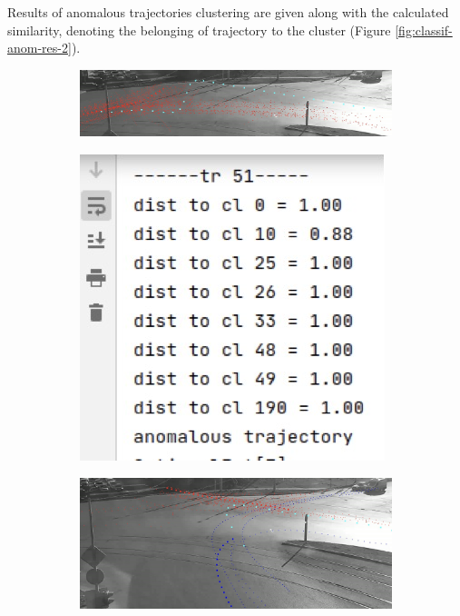 Results of anomalous trajectories clustering are given along with the calculated 
similarity, denoting the belonging of trajectory to the cluster (Figure \ref{fig:classif-anom-res-2}).

\begin{figure}[!htb]
	\centering
	\begin{subfigure}[!htb]{0.70\textwidth}
		\centering{}
		\includegraphics[width=\textwidth]{images/classif-res/classif-anom-res-2-1.jpeg}
		\caption{}
	\end{subfigure}
	\hfill
	\begin{subfigure}[!htb]{0.28\textwidth}
		\centering{}
		\includegraphics[width=\textwidth]{images/classif-res/classif-anom-res-2-1-stat.jpeg}
		\caption{}
	\end{subfigure}
	\hfill
	\begin{subfigure}[!htb]{0.70\textwidth}
		\centering{}
		\includegraphics[width=\textwidth]{images/classif-res/classif-anom-res-2-2.jpeg}

\end{subfigure}
\end{figure}
